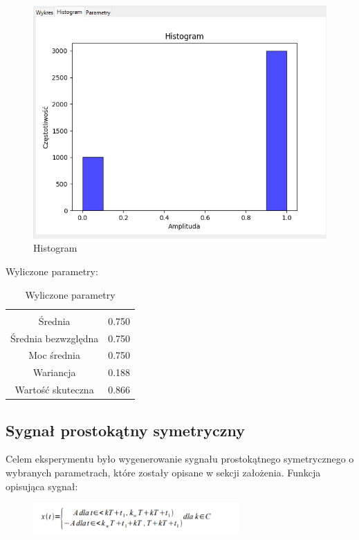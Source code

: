 \documentclass{article}
\begin{document}
\begin{figure}[h!]
    \centering
    \includegraphics[width=\textwidth]{img/prostokat/hist.png}
    \caption{Histogram}
\end{figure}
\FloatBarrier
Wyliczone parametry:
\begin{table}[h!]
    \centering
    \vspace{0.2cm}
    \begin{tabular}{|c|c|}
        \hline\hline\\[-0.4cm]
        Średnia & 0.750  \\
        \hline
        Średnia bezwzględna & 0.750  \\
        \hline
        Moc średnia & 0.750  \\
        \hline
        Wariancja & 0.188 \\
        \hline
        Wartość skuteczna & 0.866 \\
        \hline
    \end{tabular}
    \caption{Wyliczone parametry}
    \label{prostokat}
\end{table}

\subsection{Sygnał prostokątny symetryczny} \label{prostokatsymetryczny} 
Celem eksperymentu było wygenerowanie sygnału prostokątnego symetrycznego o wybranych parametrach,
które zostały opisane w sekcji założenia. Funkcja opisująca sygnał:

\begin{figure}[!htbp]
    \centering
    \includegraphics[width=0.7\textwidth]{img/prostokatsymet.png}
\end{figure}
\end{document}
